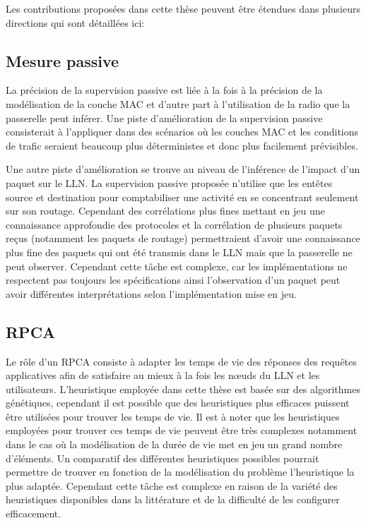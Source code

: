 Les contributions proposées dans cette thèse peuvent être étendues dans plusieurs directions qui sont détaillées ici:

\subsection{Mesure passive}

La précision de la supervision passive est liée à la fois à la précision de la modélisation de la couche MAC et d'autre part à l'utilisation de la radio que la passerelle peut inférer.
Une piste d'amélioration de la supervision passive consisterait à l'appliquer dans des scénarios où les couches \ac{MAC} et les conditions de trafic seraient beaucoup plus déterministes et donc plus facilement prévisibles.

Une autre piste d'amélioration se trouve au niveau de l'inférence de l'impact d'un paquet sur le \ac{LLN}.
La supervision passive proposée n'utilise que les entêtes source et destination pour comptabiliser une activité en se concentrant seulement sur son routage.
Cependant des corrélations plus fines mettant en jeu une connaissance approfondie des protocoles et la corrélation de plusieurs paquets reçus (notamment les paquets de routage) permettraient d'avoir une connaissance plus fine des paquets qui ont été transmis dans le \ac{LLN} mais que la passerelle ne peut observer.
Cependant cette tâche est complexe, car les implémentations ne respectent pas toujours les spécifications ainsi l'observation d'un paquet peut avoir différentes interprétations selon l'implémentation mise en jeu.

\subsection{\acl{RPCA}}

Le rôle d'un \ac{RPCA} consiste à adapter les temps de vie des réponses des requêtes applicatives afin de satisfaire au mieux à la fois les nœuds du \ac{LLN} et les utilisateurs.
L'heuristique employée dans cette thèse est basée sur des algorithmes génétiques, cependant il est possible que des heuristiques plus efficaces puissent être utilisées pour trouver les temps de vie.
Il est à noter que les heuristiques employées pour trouver ces temps de vie peuvent être très complexes notamment dans le cas où la modélisation de la durée de vie met en jeu un grand nombre d'éléments.
Un comparatif des différentes heuristiques possibles pourrait permettre de trouver en fonction de la modélisation du problème l'heuristique la plus adaptée.
Cependant cette tâche est complexe en raison de la variété des heuristiques disponibles dans la littérature et de la difficulté de les configurer efficacement.

